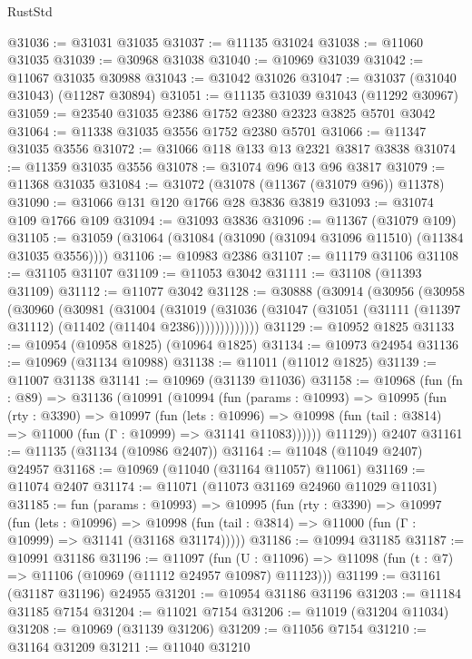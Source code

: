 \begin{lexlean}{RustStd}
\begin{coremodule}
@31036 := @31031 @31035
@31037 := @11135 @31024
@31038 := @11060 @31035
@31039 := @30968 @31038
@31040 := @10969 @31039
@31042 := @11067 @31035 @30988
@31043 := @31042 @31026
@31047 := @31037 (@31040 @31043) (@11287 @30894)
@31051 := @11135 @31039 @31043 (@11292 @30967)
@31059 := @23540 @31035 @2386 @1752 @2380 @2323 @3825 @5701 @3042
@31064 := @11338 @31035 @3556 @1752 @2380 @5701
@31066 := @11347 @31035 @3556
@31072 := @31066 @118 @133 @13 @2321 @3817 @3838
@31074 := @11359 @31035 @3556
@31078 := @31074 @96 @13 @96 @3817
@31079 := @11368 @31035
@31084 := @31072 (@31078 (@11367 (@31079 @96)) @11378)
@31090 := @31066 @131 @120 @1766 @28 @3836 @3819
@31093 := @31074 @109 @1766 @109
@31094 := @31093 @3836
@31096 := @11367 (@31079 @109)
@31105 := @31059 (@31064 (@31084 (@31090 (@31094 @31096 @11510) (@11384 @31035 @3556))))
@31106 := @10983 @2386
@31107 := @11179 @31106
@31108 := @31105 @31107
@31109 := @11053 @3042
@31111 := @31108 (@11393 @31109)
@31112 := @11077 @3042
@31128 := @30888
    (@30914
      (@30956
        (@30958
          (@30960
            (@30981
              (@31004
                (@31019
                  (@31036 (@31047 (@31051 (@31111 (@11397 @31112) (@11402 (@11404 @2386)))))))))))))
@31129 := @10952 @1825
@31133 := @10954 (@10958 @1825) (@10964 @1825)
@31134 := @10973 @24954
@31136 := @10969 (@31134 @10988)
@31138 := @11011 (@11012 @1825)
@31139 := @11007 @31138
@31141 := @10969 (@31139 @11036)
@31158 := @10968
    (fun (fn : @89) =>
    @31136
      (@10991
        (@10994
          (fun (params : @10993) =>
          @10995
            (fun (rty : @3390) =>
            @10997
              (fun (lets : @10996) =>
              @10998 (fun (tail : @3814) => @11000 (fun (Γ : @10999) => @31141 @11083))))))
        @11129))
    @2407
@31161 := @11135 (@31134 (@10986 @2407))
@31164 := @11048 (@11049 @2407) @24957
@31168 := @10969 (@11040 (@31164 @11057) @11061)
@31169 := @11074 @2407
@31174 := @11071 (@11073 @31169 @24960 @11029 @11031)
@31185 := fun (params : @10993) =>
  @10995
    (fun (rty : @3390) =>
    @10997
      (fun (lets : @10996) =>
      @10998 (fun (tail : @3814) => @11000 (fun (Γ : @10999) => @31141 (@31168 @31174)))))
@31186 := @10994 @31185
@31187 := @10991 @31186
@31196 := @11097
    (fun (U : @11096) => @11098 (fun (t : @7) => @11106 (@10969 (@11112 @24957 @10987) @11123)))
@31199 := @31161 (@31187 @31196) @24955
@31201 := @10954 @31186 @31196
@31203 := @11184 @31185 @7154
@31204 := @11021 @7154
@31206 := @11019 (@31204 @11034)
@31208 := @10969 (@31139 @31206)
@31209 := @11056 @7154
@31210 := @31164 @31209
@31211 := @11040 @31210

\end{coremodule}
\end{lexlean}
